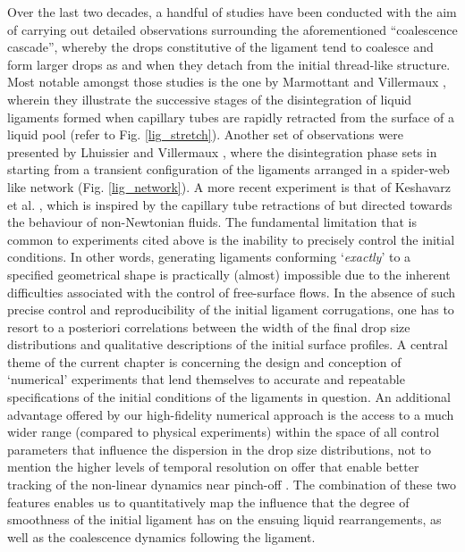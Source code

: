 Over the last two decades, a handful of studies have been conducted 
with the aim of carrying out detailed observations surrounding 
the aforementioned ``coalescence cascade'', whereby the drops 
constitutive of the ligament tend to coalesce and form larger drops
as and when they detach from the initial thread-like structure.
Most notable amongst those studies is the one by Marmottant and Villermaux \cite{vill_3},
wherein they illustrate the successive stages of the disintegration of 
liquid ligaments formed when capillary tubes are rapidly retracted from 
the surface of a liquid pool (refer to Fig. \ref{lig_stretch}). 
Another set of observations were presented by Lhuissier and Villermaux \cite{sheet_hole},
where the disintegration phase sets in starting from a transient configuration
of the ligaments arranged in a spider-web like network (Fig. \ref{lig_network}).  
A more recent experiment is that of Keshavarz et al. \cite{mckinley},
which is inspired by the capillary tube retractions of \cite{vill_3} 
but directed towards the behaviour of non-Newtonian fluids.
The fundamental limitation that is common to experiments cited above 
is the inability to precisely control the initial conditions.
In other words, generating ligaments conforming `\textit{exactly}'
to a specified geometrical shape is practically (almost) impossible 
due to the inherent difficulties associated with the control of free-surface flows.  
In the absence of such precise control and reproducibility of the initial 
ligament corrugations, one has to resort to a posteriori correlations between 
the width of the final drop size distributions and qualitative descriptions 
of the initial surface profiles.
A central theme of the current chapter is concerning the design and conception
of `numerical' experiments that lend themselves to accurate and repeatable 
specifications of the initial conditions of the ligaments in question.  
An additional advantage offered by our high-fidelity numerical approach 
is the access to a much wider range (compared to physical experiments) within the 
space of all control parameters that influence the dispersion in the drop size distributions, 
not to mention the higher levels of temporal resolution on offer 
that enable better tracking of the non-linear dynamics near pinch-off
. 
The combination of these two features enables us to quantitatively map the 
influence that the degree of smoothness of the initial ligament has on the ensuing 
liquid rearrangements, as well as the coalescence dynamics following the ligament. 


